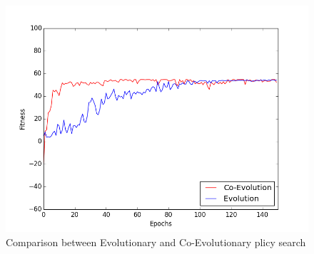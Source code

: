 \begin{figure}[ht]
  \centering
  \includegraphics[scale=0.5]{images/together.png}
  \caption{Comparison between Evolutionary and Co-Evolutionary plicy search}\label{comparison}
\end{figure}

